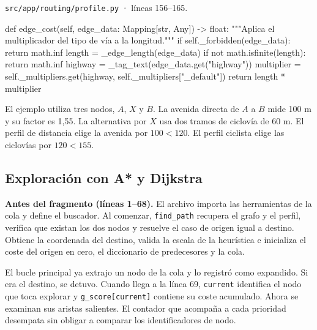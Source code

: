 \documentclass[11pt,a4paper]{article}
\begin{document}
\par\medskip
\noindent\begin{minipage}{\linewidth}
{\footnotesize\nolinkurl{src/app/routing/profile.py} · líneas 156--165.\par}
\nopagebreak[4]
\begin{Codigo}[firstnumber=156]
    def edge_cost(self, edge_data: Mapping[str, Any]) -> float:
        """Aplica el multiplicador del tipo de vía a la longitud."""
        if self._forbidden(edge_data):
            return math.inf
        length = _edge_length(edge_data)
        if not math.isfinite(length):
            return math.inf
        highway = _tag_text(edge_data.get("highway"))
        multiplier = self._multipliers.get(highway, self._multipliers["_default"])
        return length * multiplier
\end{Codigo}
\end{minipage}\par

El ejemplo utiliza tres nodos, \(A\), \(X\) y \(B\). La avenida directa de \(A\) a \(B\) mide 100 m y su factor es 1,55. La alternativa por \(X\) usa dos tramos de ciclovía de 60 m. El perfil de distancia elige la avenida por \(100<120\). El perfil ciclista elige las ciclovías por \(120<155\).

\subsection{Exploración con A* y Dijkstra}

\textbf{Antes del fragmento (líneas 1--68).} El archivo importa las herramientas de la cola y define el buscador. Al comenzar, \texttt{find\_path} recupera el grafo y el perfil, verifica que existan los dos nodos y resuelve el caso de origen igual a destino. Obtiene la coordenada del destino, valida la escala de la heurística e inicializa el coste del origen en cero, el diccionario de predecesores y la cola.

El bucle principal ya extrajo un nodo de la cola y lo registró como expandido. Si era el destino, se detuvo. Cuando llega a la línea 69, \texttt{current} identifica el nodo que toca explorar y \texttt{g\_score[current]} contiene su coste acumulado. Ahora se examinan sus aristas salientes. El contador que acompaña a cada prioridad desempata sin obligar a comparar los identificadores de nodo.
\end{document}
